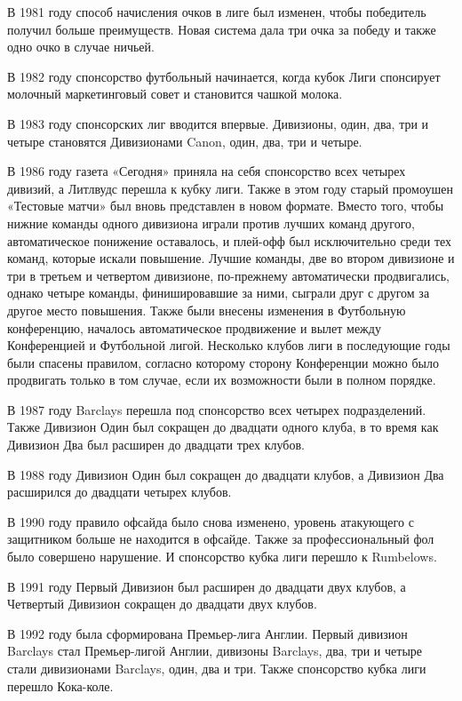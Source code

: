 В 1981 году способ начисления очков в лиге был изменен, чтобы победитель получил больше преимуществ. Новая система дала три очка за победу и также одно очко в случае ничьей.

В 1982 году спонсорство футбольный начинается, когда кубок Лиги спонсирует молочный маркетинговый совет и становится чашкой молока.

В 1983 году спонсорских лиг вводится впервые. Дивизионы, один, два, три и четыре становятся Дивизионами Canon, один, два, три и четыре.

В 1986 году газета «Сегодня» приняла на себя спонсорство всех четырех дивизий, а Литлвудс перешла к кубку лиги. Также в этом году старый промоушен «Тестовые матчи» был вновь представлен в новом формате. Вместо того, чтобы нижние команды одного дивизиона играли против лучших команд другого, автоматическое понижение оставалось, и плей-офф был исключительно среди тех команд, которые искали повышение. Лучшие команды, две во втором дивизионе и три в третьем и четвертом дивизионе, по-прежнему автоматически продвигались, однако четыре команды, финишировавшие за ними, сыграли друг с другом за другое место повышения. Также были внесены изменения в Футбольную конференцию, началось автоматическое продвижение и вылет между Конференцией и Футбольной лигой. Несколько клубов лиги в последующие годы были спасены правилом, согласно которому сторону Конференции можно было продвигать только в том случае, если их возможности были в полном порядке.

В 1987 году Barclays перешла под спонсорство всех четырех подразделений. Также Дивизион Один был сокращен до двадцати одного клуба, в то время как Дивизион Два был расширен до двадцати трех клубов.

В 1988 году Дивизион Один был сокращен до двадцати клубов, а Дивизион Два расширился до двадцати четырех клубов.

В 1990 году правило офсайда было снова изменено, уровень атакующего с защитником больше не находится в офсайде. Также за профессиональный фол было совершено нарушение. И спонсорство кубка лиги перешло к Rumbelows.

В 1991 году Первый Дивизион был расширен до двадцати двух клубов, а Четвертый Дивизион сокращен до двадцати двух клубов.

В 1992 году была сформирована Премьер-лига Англии. Первый дивизион Barclays стал Премьер-лигой Англии, дивизоны Barclays, два, три и четыре стали дивизионами Barclays, один, два и три. Также спонсорство кубка лиги перешло Кока-коле.

